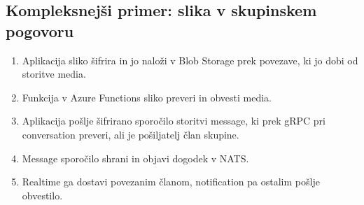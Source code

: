 \documentclass[11pt,a4paper]{article}
\begin{document}
\subsection{Kompleksnejši primer: slika v skupinskem pogovoru}
\begin{enumerate}
\item Aplikacija sliko šifrira in jo naloži v Blob Storage prek povezave, ki jo dobi od storitve media.
\item Funkcija v Azure Functions sliko preveri in obvesti media.
\item Aplikacija pošlje šifrirano sporočilo storitvi message, ki prek gRPC pri conversation preveri, ali je pošiljatelj član skupine.
\item Message sporočilo shrani in objavi dogodek v NATS.
\item Realtime ga dostavi povezanim članom, notification pa ostalim pošlje obvestilo.
\end{enumerate}
\end{document}
